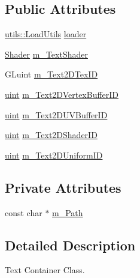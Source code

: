 \subsection*{Public Attributes}
\begin{DoxyCompactItemize}
\item 
\hyperlink{classspork_1_1utils_1_1_load_utils}{utils\+::\+Load\+Utils} \hyperlink{classspork_1_1graphics_1_1_text_container_a32e7f7af04cf6aab22a462a0a1763111}{loader}
\item 
\hyperlink{classspork_1_1graphics_1_1_shader}{Shader} \hyperlink{classspork_1_1graphics_1_1_text_container_a3a89e588d01b57aefc4cfdc37d2ee7e6}{m\+\_\+\+Text\+Shader}
\item 
G\+Luint \hyperlink{classspork_1_1graphics_1_1_text_container_abf191e64b578694758840b9b08f35f4f}{m\+\_\+\+Text2\+D\+Tex\+ID}
\item 
\hyperlink{defines_8h_a91ad9478d81a7aaf2593e8d9c3d06a14}{uint} \hyperlink{classspork_1_1graphics_1_1_text_container_ae59c249f016c85e86bff6c1be939f872}{m\+\_\+\+Text2\+D\+Vertex\+Buffer\+ID}
\item 
\hyperlink{defines_8h_a91ad9478d81a7aaf2593e8d9c3d06a14}{uint} \hyperlink{classspork_1_1graphics_1_1_text_container_a18c0b39008e60b277f3baf5bb81bf632}{m\+\_\+\+Text2\+D\+U\+V\+Buffer\+ID}
\item 
\hyperlink{defines_8h_a91ad9478d81a7aaf2593e8d9c3d06a14}{uint} \hyperlink{classspork_1_1graphics_1_1_text_container_a0374741cdbab8c64bdf490665204cbfd}{m\+\_\+\+Text2\+D\+Shader\+ID}
\item 
\hyperlink{defines_8h_a91ad9478d81a7aaf2593e8d9c3d06a14}{uint} \hyperlink{classspork_1_1graphics_1_1_text_container_a1872c800795971390a9f0fa0334e8a92}{m\+\_\+\+Text2\+D\+Uniform\+ID}
\end{DoxyCompactItemize}
\subsection*{Private Attributes}
\begin{DoxyCompactItemize}
\item 
const char $\ast$ \hyperlink{classspork_1_1graphics_1_1_text_container_a4b36fa27b2b511ac8444e00c5474b38b}{m\+\_\+\+Path}
\end{DoxyCompactItemize}


\subsection{Detailed Description}
Text Container Class. 

